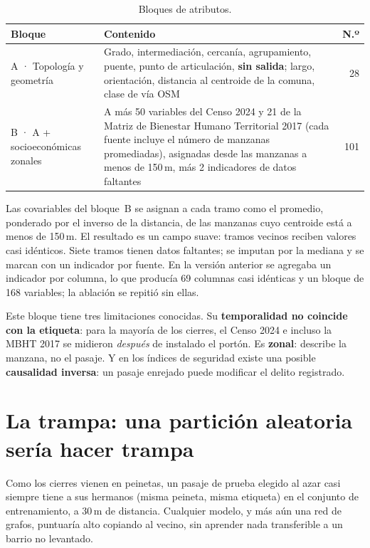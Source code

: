 \documentclass[11pt,a4paper]{article}
\begin{document}
\begin{table}[H]
  \centering
  \caption{Bloques de atributos.}
  \label{tab:bloques}
  \begin{tabularx}{\textwidth}{lYr}
    \toprule
    Bloque & Contenido & N.º \\
    \midrule
    A · Topología y geometría & Grado, intermediación, cercanía, agrupamiento, puente, punto de
      articulación, \textbf{sin salida}; largo, orientación, distancia al centroide de la comuna,
      clase de vía OSM & 28 \\
    B · A + socioeconómicas zonales & A más 50 variables del Censo 2024 y 21 de la Matriz de
      Bienestar Humano Territorial 2017 (cada fuente incluye el número de manzanas promediadas),
      asignadas desde las manzanas a menos de 150\,m, más 2 indicadores de datos faltantes & 101 \\
    \bottomrule
  \end{tabularx}
\end{table}

Las covariables del bloque~B se asignan a cada tramo como el promedio, ponderado por el inverso de
la distancia, de las manzanas cuyo centroide está a menos de 150\,m. El resultado es un campo
suave: tramos vecinos reciben valores casi idénticos. Siete tramos tienen datos faltantes; se
imputan por la mediana y se marcan con un indicador por fuente. En la versión anterior se agregaba
un indicador por columna, lo que producía 69 columnas casi idénticas y un bloque de 168 variables;
la ablación se repitió sin ellas.

Este bloque tiene tres limitaciones conocidas. Su \textbf{temporalidad no coincide con la
etiqueta}: para la mayoría de los cierres, el Censo 2024 e incluso la MBHT 2017 se midieron
\emph{después} de instalado el portón. Es \textbf{zonal}: describe la manzana, no el pasaje. Y en
los índices de seguridad existe una posible \textbf{causalidad inversa}: un pasaje enrejado puede
modificar el delito registrado.

\section{La trampa: una partición aleatoria sería hacer trampa}

Como los cierres vienen en peinetas, un pasaje de prueba elegido al azar casi siempre tiene a sus
hermanos (misma peineta, misma etiqueta) en el conjunto de entrenamiento, a 30\,m de distancia.
Cualquier modelo, y más aún una red de grafos, puntuaría alto copiando al vecino, sin aprender nada
transferible a un barrio no levantado.
\end{document}
